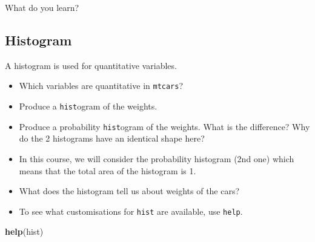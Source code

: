 \documentclass[]{article}
\newenvironment{Shaded}{\begin{snugshade}}{\end{snugshade}}
\newcommand{\DataTypeTok}[1]{\textcolor[rgb]{0.13,0.29,0.53}{#1}}
\newcommand{\KeywordTok}[1]{\textcolor[rgb]{0.13,0.29,0.53}{\textbf{#1}}}
\newcommand{\NormalTok}[1]{#1}
\newcommand{\OperatorTok}[1]{\textcolor[rgb]{0.81,0.36,0.00}{\textbf{#1}}}
\providecommand{\tightlist}{%
  \setlength{\itemsep}{0pt}\setlength{\parskip}{0pt}}
\begin{document}
What do you learn?

\hypertarget{histogram}{%
\subsection{Histogram}\label{histogram}}

A histogram is used for quantitative variables.

\begin{itemize}
\item
  Which variables are quantitative in \texttt{mtcars}?
\item
  Produce a \texttt{hist}ogram of the weights.
\end{itemize}

\begin{Shaded}
\end{Shaded}

\begin{itemize}
\tightlist
\item
  Produce a probability \texttt{hist}ogram of the weights. What is the difference? Why do the 2 histograms have an identical shape here?
\end{itemize}

\begin{Shaded}
\end{Shaded}

\begin{itemize}
\item
  In this course, we will consider the probability histogram (2nd one) which means that the total area of the histogram is 1.
\item
  What does the histogram tell us about weights of the cars?
\item
  To see what customisations for \texttt{hist} are available, use \texttt{help}.
\end{itemize}

\begin{Shaded}
\begin{Highlighting}[]
\KeywordTok{help}\NormalTok{(hist)}
\end{Highlighting}
\end{Shaded}
\end{document}
